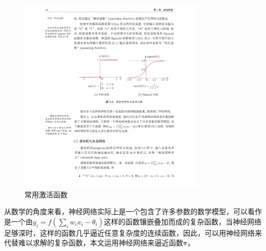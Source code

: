 \begin{figure}[htbp]
	\begin{center}
		\includegraphics[width=0.8\textwidth]{figures//3.pdf}
		\caption{常用激活函数}
		\label{default}
	\end{center}
\end{figure}
\par 从数学的角度来看，神经网络实际上是一个包含了许多参数的数学模型，可以看作是一个由$y_i = f(\sum_i w_ix_i-\theta_i)$这样的函数镶嵌叠加而成的复杂函数，当神经网络足够深时，这样的函数几乎逼近任意复杂度的连续函数，因此，可以用神经网络来代替难以求解的复杂函数，本文运用神经网络来逼近函数$\boldsymbol{\tau}$。
